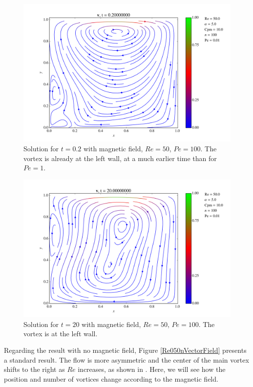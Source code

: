 \documentclass[journal]{IEEEtran}
\begin{document}
\begin{figure}[!t]
\centering
\includegraphics[width=\linewidth]{figures/MagRe50Pe001/Re50Pe001_t02}
\caption{Solution for $t=0.2$ with magnetic field, $\mathit{Re}=50$, $\mathit{Pe}=100$. The vortex is already at the left wall, at a much earlier time than for $\mathit{Pe}=1$. \label{Re050Pe001t02}}
\end{figure}

\begin{figure}[!t]
\centering
\includegraphics[width=\linewidth]{figures/MagRe50Pe001/Re50Pe001_t20}
\caption{Solution for $t=20$ with magnetic field, $\mathit{Re}=50$, $\mathit{Pe}=100$. The vortex is at the left wall. \label{Re050Pe001t20}}
\end{figure}


Regarding the result with no magnetic field, Figure \ref{Re050nVectorField} presents a standard result. The flow is more asymmetric and the center of the main vortex shifts to the right as $\mathit{Re}$ increases, as shown in \cite{ataias2015}. Here, we will see how the position and number of vortices change according to the magnetic field.
\end{document}
